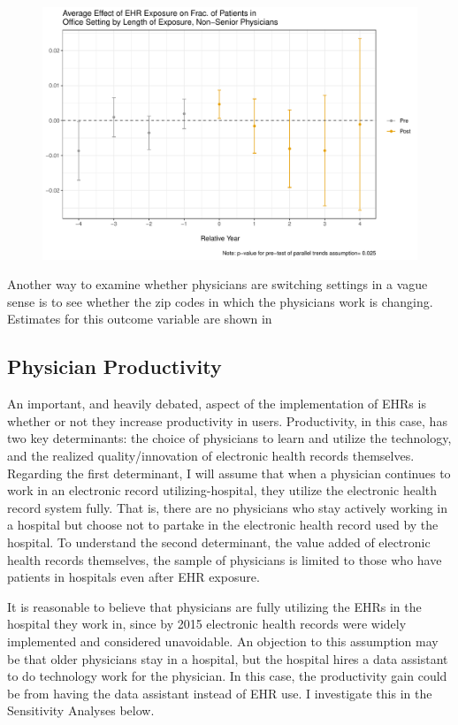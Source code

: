 \documentclass[11pt]{article}
\begin{document}
\begin{figure}[ht]
{\begin{minipage}[b]{0.47\linewidth}
            \includegraphics[width=\textwidth]{Objects/CS_office_fracyoung_allEHR.pdf}
        \end{minipage}}
        \label{fig:officesecond}
\end{figure}

Another way to examine whether physicians are switching settings in a vague sense is to see whether the zip codes in which the physicians work is changing. Estimates for this outcome variable are shown in




\subsection{Physician Productivity}

An important, and heavily debated, aspect of the implementation of EHRs is whether or not they increase productivity in users. Productivity, in this case, has two key determinants: the choice of physicians to learn and utilize the technology, and the realized quality/innovation of electronic health records themselves. Regarding the first determinant, I will assume that when a physician continues to work in an electronic record utilizing-hospital, they utilize the electronic health record system fully. That is, there are no physicians who stay actively working in a hospital but choose not to partake in the electronic health record used by the hospital. To understand the second determinant, the value added of electronic health records themselves, the sample of physicians is limited to those who have patients in hospitals even after EHR exposure. 

It is reasonable to believe that physicians are fully utilizing the EHRs in the hospital they work in, since by 2015 electronic health records were widely implemented and considered unavoidable. An objection to this assumption may be that older physicians stay in a hospital, but the hospital hires a data assistant to do technology work for the physician. In this case, the productivity gain could be from having the data assistant instead of EHR use. I investigate this in the Sensitivity Analyses below.
\end{document}
